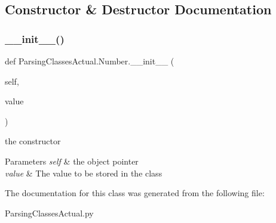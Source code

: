 \subsection{Constructor \& Destructor Documentation}
\mbox{\label{class_parsing_classes_actual_1_1_number_afed3ef381388f6d2db19fec207e2bbf5}} 
\subsubsection{\texorpdfstring{\+\_\+\+\_\+init\+\_\+\+\_\+()}{\_\_init\_\_()}}
{\footnotesize\ttfamily def Parsing\+Classes\+Actual.\+Number.\+\_\+\+\_\+init\+\_\+\+\_\+ (\begin{DoxyParamCaption}\item[{}]{self,  }\item[{}]{value }\end{DoxyParamCaption})}



the constructor 


\begin{DoxyParams}{Parameters}
{\em self} & the object pointer \\
\hline
{\em value} & The value to be stored in the class \\
\hline
\end{DoxyParams}


The documentation for this class was generated from the following file\+:\begin{DoxyCompactItemize}
\item 
Parsing\+Classes\+Actual.\+py\end{DoxyCompactItemize}
